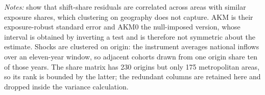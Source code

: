 \begin{table}[!htbp]
\centering
\caption{Exposure-Robust Standard Errors}
\label{tab:akm_inference}
\begin{minipage}{\textwidth}
\footnotesize
\vspace{4pt}
\textit{Notes:} \citet{adao2019shift} show that shift-share residuals are correlated across areas with similar exposure shares, which clustering on geography does not capture. AKM is their exposure-robust standard error and AKM0 the null-imposed version, whose interval is obtained by inverting a test and is therefore not symmetric about the estimate. Shocks are clustered on origin: the instrument averages national inflows over an eleven-year window, so adjacent cohorts drawn from one origin share ten of those years. The share matrix has 230 origins but only 175 metropolitan areas, so its rank is bounded by the latter; the redundant columns are retained here and dropped inside the variance calculation.
\end{minipage}
\end{table}

